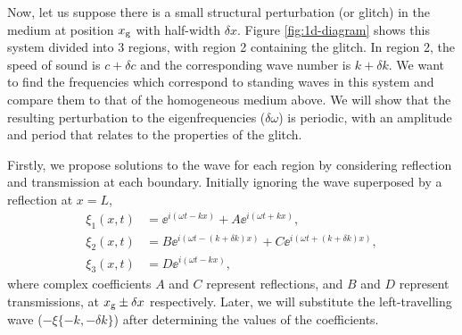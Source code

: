 Now, let us suppose there is a small structural perturbation (or glitch) in the medium at position \(x_{{\mathrm{g}}}\) with half-width \(\delta x\). Figure \ref{fig:1d-diagram} shows this system divided into 3 regions, with region 2 containing the glitch. In region 2, the speed of sound is \(c + \delta c\) and the corresponding wave number is \(k + \delta k\). We want to find the frequencies which correspond to standing waves in this system and compare them to that of the homogeneous medium above. We will show that the resulting perturbation to the eigenfrequencies (\(\delta\omega\)) is periodic, with an amplitude and period that relates to the properties of the glitch.

Firstly, we propose solutions to the wave for each region by considering reflection and transmission at each boundary. Initially ignoring the wave superposed by a reflection at \(x=L\),
%
\begin{align}
    \xi_1(x, t) &= \ee^{i(\omega t - k x)} + A \ee^{i(\omega t + k x)}, \label{eq:xi1-r} \\
    \xi_2(x, t) &= B\ee^{i(\omega t - (k + \delta k) x)} + C \ee^{i(\omega t + (k + \delta k) x)}, \label{eq:xi2-r} \\
    \xi_3(x, t) &= D \ee^{i(\omega t - k x)}, \label{eq:xi3-r}
\end{align}
%
where complex coefficients \(A\) and \(C\) represent reflections, and \(B\) and \(D\) represent transmissions, at \(x_{{\mathrm{g}}} \pm \delta x\) respectively. Later, we will substitute the left-travelling wave (\(- \xi\{-k, -\delta k\}\)) after determining the values of the coefficients.


